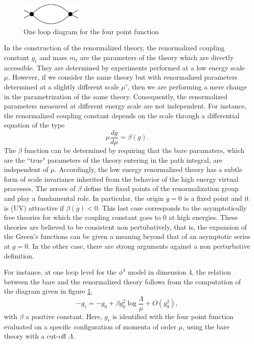 \documentclass[12pt,here,feynmf]{article}
\begin{document}
\begin{figure}
\begin{center}
\includegraphics[width=3cm]{oneloop.pdf}
\caption{One loop diagram for the four point function}
\label{simpleoneloop}
\end{center}
\end{figure}

In the construction of the renormalized theory, the renormalized coupling constant $g_{\mathrm{r}}$ and mass $m_{\mathrm{r}}$ are the parameters of the theory which are directly accessible. They are determined by experiments performed at a low energy scale $\mu$. However, if we consider the same theory but with renormalized parameters determined at a slightly different scale $\mu'$, then we are performing a mere change in the parametrization of the same theory. Consequently, the renormalized parameters measured at different energy scale are not independent. For instance, the renormalized coupling  constant depends on the scale through a differential equation of the type
\begin{equation}
\mu\frac{dg}{d\mu}=\beta(g).
\end{equation}    
The $\beta$ function can be determined by requiring that the bare paramaters, which are the ``true" parameters of the theory entering in the path integral, are independent of $\mu$.  Accordingly, the low energy renormalized theory has a subtle form of scale invariance inherited from the behavior of the high energy virtual processes. The zeroes of $\beta$ define the fixed points of the renormalization group  and play a fundamental role. In particular, the origin $g=0$ is a fixed point and it is (UV) attractive if $\beta(g)<0$. This last case corresponds to the asymptotically free theories for which the coupling constant goes to $0$ at high energies.  These theories are believed to be consistent non pertubatively, that is,  the expansion of the Green's functions can be given a meaning beyond that of an asymptotic series at $g=0$. In the other case, there are strong arguments against a non perturbative definition.




For instance, at one loop level for the $\phi^{4}$ model in dimension 4, the relation between the bare and the renormalized theory follows from the computation of the diagram given in figure \ref{simpleoneloop},
\begin{equation}
-g_{\mathrm{r}}=-g_{0}+\beta g_{0}^{2}\log\frac{\Lambda}{\mu}+O(g_{0}^{2}),\label{betaoneloop}
\end{equation}
with $\beta$ a positive constant. Here, $g_{r}$ is identified with the four point function evaluated on a specific configuration of momenta of order $\mu$, using the bare theory with a cut-off $\Lambda$. 
\end{document}
